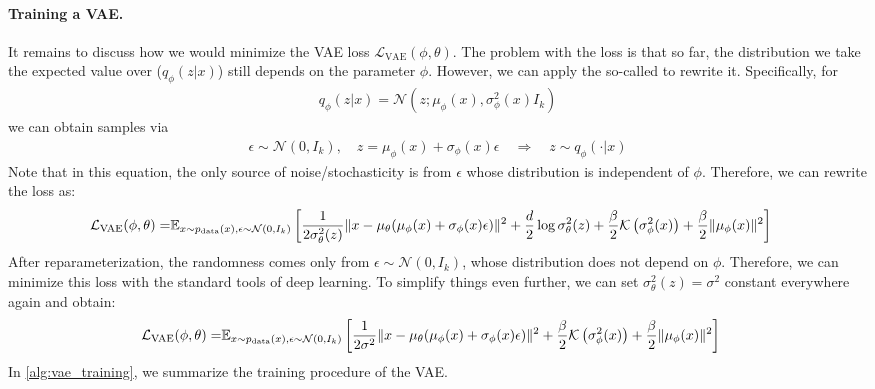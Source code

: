 \paragraph{Training a VAE.} It remains to discuss how we would minimize the VAE loss $\mathcal{L}_{\text{VAE}}(\phi,\theta)$. The problem with the loss is that so far, the distribution we take the expected value over ($q_\phi(z|x)$) still depends on the parameter $\phi$. However, we can apply the so-called  to rewrite it.  Specifically, for 
\begin{align*}
q_\phi(z|x)=\mathcal{N}(z;\mu_\phi(x),\sigma_\phi^2(x)I_k)
\end{align*}
we can obtain samples via
\begin{align*}
\epsilon\sim\mathcal{N}(0,I_k),\quad z=\mu_\phi(x)+\sigma_\phi(x)\epsilon \quad \Rightarrow\quad z\sim q_\phi(\cdot|x)
\end{align*}
Note that in this equation, the only source of noise/stochasticity is from $\epsilon$ whose distribution is independent of $\phi$. Therefore, we can rewrite the loss as:
\begin{align*}
\mathcal{L}_{\text{VAE}}(\phi,\theta)=&\mathbb{E}_{x \sim p_{\rm{data}}(x),\epsilon\sim\mathcal{N}(0,I_k)} \left[\frac{1}{2\sigma^2_\theta(z)}\|x-\mu_\theta(\mu_\phi(x)+\sigma_\phi(x)\epsilon)\|^2+\frac{d}{2}\log \sigma_{\theta}^2(z)
+\frac{\beta}{2}
\mathcal{K}\left(\sigma_{\phi}^2(x)\right)+ \frac{\beta}{2} \|\mu_\phi(x)\|^2
\right]
\end{align*}
After reparameterization, the randomness comes only from $\epsilon\sim\mathcal{N}(0,I_k)$, whose distribution does not depend on $\phi$. Therefore, we can minimize this loss with the standard tools of deep learning. To simplify things even further, we can set $\sigma_{\theta}^2(z)=\sigma^2$ constant everywhere again and obtain:
\begin{align*}
\mathcal{L}_{\text{VAE}}(\phi,\theta)=&\mathbb{E}_{x \sim p_{\rm{data}}(x),\epsilon\sim\mathcal{N}(0,I_k)} \left[\frac{1}{2\sigma^2}\|x-\mu_\theta(\mu_\phi(x)+\sigma_\phi(x)\epsilon)\|^2
+\frac{\beta}{2}
\mathcal{K}\left(\sigma_{\phi}^2(x)\right)+ \frac{\beta}{2} \|\mu_\phi(x)\|^2
\right]
\end{align*}
In \cref{alg:vae_training}, we summarize the training procedure of the VAE.
